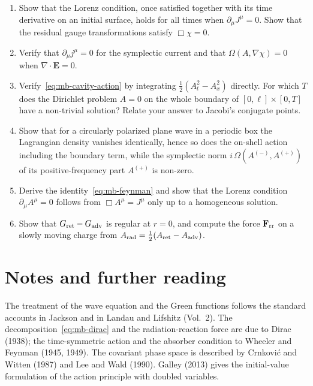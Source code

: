 \begin{enumerate}
\item Show that the Lorenz condition, once satisfied together with its
time derivative on an initial surface, holds for all times when
$\partial_\mu J^\mu=0$. Show that the residual gauge transformations
satisfy $\Box\chi=0$.
\item Verify that $\partial_\mu j^\mu=0$ for the symplectic current
and that $\Omega(A,\nabla\chi)=0$ when $\nabla\cdot\mathbf E=0$.
\item Verify~\eqref{eq:mb-cavity-action} by integrating $\tfrac12(A_t^2-A_x^2)$
directly. For which $T$ does the Dirichlet problem $A=0$ on the whole
boundary of $[0,\ell]\times[0,T]$ have a non-trivial solution? Relate your
answer to Jacobi's conjugate points.
\item\label{ex:mb-plane} Show that for a circularly polarized plane wave
in a periodic box the Lagrangian density vanishes identically, hence so
does the on-shell action including the boundary term, while the symplectic norm
$i\,\Omega(A^{(-)},A^{(+)})$ of its positive-frequency part $A^{(+)}$ is non-zero.
\item Derive the identity~\eqref{eq:mb-feynman} and show that the Lorenz
condition $\partial_\mu A^\mu=0$ follows from $\Box A^\mu=J^\mu$ only up to
a homogeneous solution.
\item Show that $G_{\rm ret}-G_{\rm adv}$ is regular at $r=0$, and
compute the force $\mathbf F_{\rm rr}$ on a slowly moving charge from
$A_{\rm rad}=\tfrac12(A_{\rm ret}-A_{\rm adv})$.
\end{enumerate}

\section*{Notes and further reading}

The treatment of the wave equation and the Green functions follows the
standard accounts in Jackson and in Landau and Lifshitz (Vol.~2). The
decomposition~\eqref{eq:mb-dirac} and the radiation-reaction force are due
to Dirac (1938); the time-symmetric action and the absorber condition to
Wheeler and Feynman (1945, 1949). The covariant phase space is described by
Crnkovi\'c and Witten (1987) and Lee and Wald (1990). Galley (2013) gives
the initial-value formulation of the action principle with doubled
variables.

